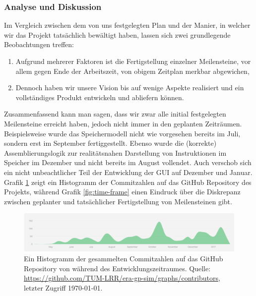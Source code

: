 
\subsubsection{Analyse und Diskussion}
\label{team:orga-plan-anal}

Im Vergleich zwischen dem von uns festgelegten Plan und der Manier, in welcher wir das Projekt tatsächlich bewältigt haben, lassen sich zwei grundlegende Beobachtungen treffen:
\vspace{-0.2cm}
\begin{enumerate}
  \item Aufgrund mehrerer Faktoren ist die Fertigstellung einzelner Meilensteine, vor allem gegen Ende der Arbeitszeit, von obigem Zeitplan merkbar abgewichen,
  \item Dennoch haben wir unsere Vision bis auf wenige Aspekte realisiert und ein vollständiges Produkt entwickeln und abliefern können.
\end{enumerate}

Zusammenfassend kann man sagen, dass wir zwar alle initial festgelegten
Meilensteine erreicht haben, jedoch nicht immer in den geplanten Zeiträumen.
Beispielsweise wurde das Speichermodell nicht wie vorgesehen bereits im Juli,
sondern erst im September fertiggestellt. Ebenso wurde die (korrekte)
Assemblierungslogik zur realitätsnahen Darstellung von Instruktionen im Speicher
im Dezember und nicht bereits im August vollendet. Auch verschob sich ein nicht
unbeachtlicher Teil der Entwicklung der GUI auf Dezember und Januar. Grafik
\ref{fig:commit-history} zeigt ein Histogramm der Commitzahlen
auf das GitHub Repository des Projekts, während Grafik \ref{fig:time-frame}
einen Eindruck über die Diskrepanz zwischen geplanter und tatsächlicher
Fertigstellung von Meilensteinen gibt.

\begin{figure}[b!]
  \centering
  \includegraphics[scale=0.45]{figures/commit-history}
  \caption{Ein Histogramm der gesammelten Commitzahlen auf das GitHub Repository von \erasim{} während des Entwicklungszeitraumes. Quelle: {\small\url{https://github.com/TUM-LRR/era-gp-sim/graphs/contributors}}, letzter Zugriff \today.}
  \label{fig:commit-history}
\end{figure}

